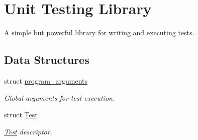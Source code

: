 \hypertarget{group__Testing}{\section{Unit Testing Library}
\label{group__Testing}
}


A simple but powerful library for writing and executing tests.  


\subsection*{Data Structures}
\begin{DoxyCompactItemize}
\item 
struct \hyperlink{structprogram__arguments}{program\-\_\-arguments}
\begin{DoxyCompactList}\small\item\em Global arguments for test execution. \end{DoxyCompactList}\item 
struct \hyperlink{structTest}{Test}
\begin{DoxyCompactList}\small\item\em \hyperlink{structTest}{Test} descriptor. \end{DoxyCompactList}\end{DoxyCompactItemize}
